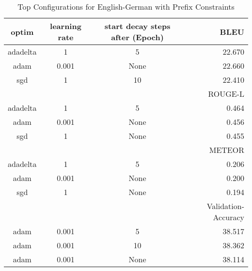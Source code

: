 \begin{table}
	\caption{Top Configurations for English-German with Prefix Constraints}
	\label{tab:optim_tagged-de-en}
	\centering
\begin{tabular}{|c|c|c|r|}
	\hline
	optim   & learning rate & start decay steps after (Epoch)  & BLEU\\
	\hline
	 adadelta&       1     &        5    & 22.670\\
	   adam &     0.001   &       None     & 22.660\\
	   sgd  &       1     &       10     & 22.410\\
	\hline
	\hline
	& & & ROUGE-L \\
	\hline
	 adadelta&       1     &        5   & 0.464\\
	   adam &     0.001   &       None    & 0.456\\
	   sgd  &       1     &       None    & 0.455\\
	\hline
	\hline
	& & & METEOR \\
	\hline
	 adadelta&       1     &        5     & 0.206\\
	   adam &     0.001   &       None     & 0.200\\
	   sgd  &       1     &       None     & 0.194\\
	\hline
	\hline
	& & & Validation-Accuracy \\
	\hline
	   adam &     0.001   &        5     & 38.517\\
	   adam &     0.001   &       10     & 38.362\\
	   adam &     0.001   &       None     & 38.114\\
	\hline
\end{tabular}
\end{table}

